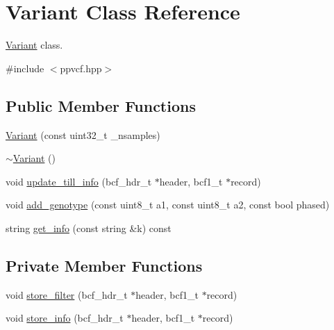 \hypertarget{classVariant}{}\section{Variant Class Reference}
\label{classVariant}


\mbox{\hyperlink{classVariant}{Variant}} class.  




{\ttfamily \#include $<$ppvcf.\+hpp$>$}

\subsection*{Public Member Functions}
\begin{DoxyCompactItemize}
\item 
\mbox{\hyperlink{classVariant_a4019e075040ef2a36ac73d86d01ace70}{Variant}} (const uint32\+\_\+t \+\_\+nsamples)
\item 
\mbox{\hyperlink{classVariant_afefce84ee3f94c9154c69e2e9a62f0b0}{$\sim$\+Variant}} ()
\item 
void \mbox{\hyperlink{classVariant_a2fbc7e5f6debf1f9cf00ad986062e5b6}{update\+\_\+till\+\_\+info}} (bcf\+\_\+hdr\+\_\+t $\ast$header, bcf1\+\_\+t $\ast$record)
\item 
void \mbox{\hyperlink{classVariant_a9b58c112529f33a075d709599d639810}{add\+\_\+genotype}} (const uint8\+\_\+t a1, const uint8\+\_\+t a2, const bool phased)
\item 
string \mbox{\hyperlink{classVariant_ae572289ca028ad547c1d77ce381f808c}{get\+\_\+info}} (const string \&k) const
\end{DoxyCompactItemize}
\subsection*{Private Member Functions}
\begin{DoxyCompactItemize}
\item 
void \mbox{\hyperlink{classVariant_aa02a6da5df30097ddc284692f31552e9}{store\+\_\+filter}} (bcf\+\_\+hdr\+\_\+t $\ast$header, bcf1\+\_\+t $\ast$record)
\item 
void \mbox{\hyperlink{classVariant_a8d76e6358f4199b494d2ca32e30c05b8}{store\+\_\+info}} (bcf\+\_\+hdr\+\_\+t $\ast$header, bcf1\+\_\+t $\ast$record)
\end{DoxyCompactItemize}
